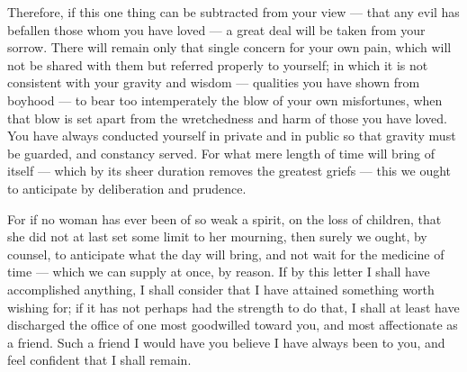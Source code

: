  Therefore, if this one thing can be subtracted from your view --- that any evil has befallen those whom you have loved --- a great deal will be taken from your sorrow. There will remain only that single concern for your own pain, which will not be shared with them but referred properly to yourself; in which it is not consistent with your gravity and wisdom --- qualities you have shown from boyhood --- to bear too intemperately the blow of your own misfortunes, when that blow is set apart from the wretchedness and harm of those you have loved. You have always conducted yourself in private and in public so that gravity must be guarded, and constancy served. For what mere length of time will bring of itself --- which by its sheer duration removes the greatest griefs --- this we ought to anticipate by deliberation and prudence.

 For if no woman has ever been of so weak a spirit, on the loss of children, that she did not at last set some limit to her mourning, then surely we ought, by counsel, to anticipate what the day will bring, and not wait for the medicine of time --- which we can supply at once, by reason. If by this letter I shall have accomplished anything, I shall consider that I have attained something worth wishing for; if it has not perhaps had the strength to do that, I shall at least have discharged the office of one most goodwilled toward you, and most affectionate as a friend. Such a friend I would have you believe I have always been to you, and feel confident that I shall remain.
